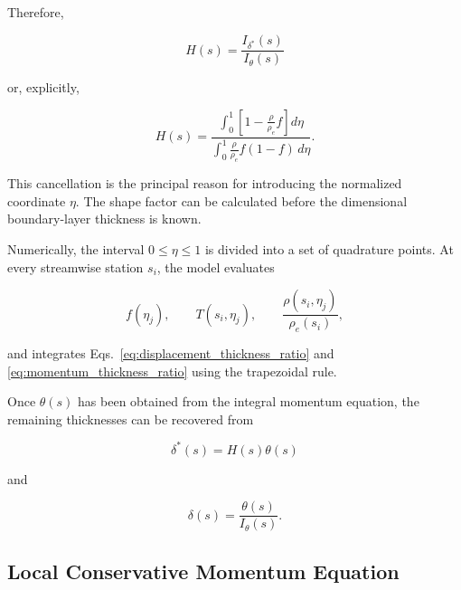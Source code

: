 Therefore,

\begin{equation}
    \boxed{
    H(s)
    =
    \frac{I_{\delta^*}(s)}
         {I_\theta(s)}
    }
    \label{eq:shape_factor_ratio}
\end{equation}

or, explicitly,

\begin{equation}
    \boxed{
    H(s)
    =
    \frac{
        \displaystyle
        \int_0^1
        \left[
            1-
            \frac{\rho}{\rho_e}f
        \right]d\eta
    }{
        \displaystyle
        \int_0^1
        \frac{\rho}{\rho_e}
        f(1-f)\,d\eta
    }
    }.
    \label{eq:shape_factor_profile_closure}
\end{equation}

This cancellation is the principal reason for introducing the normalized
coordinate \(\eta\). The shape factor can be calculated before the dimensional
boundary-layer thickness is known.

Numerically, the interval \(0\leq\eta\leq1\) is divided into a set of
quadrature points. At every streamwise station \(s_i\), the model evaluates

\begin{equation}
    f(\eta_j),\qquad
    T(s_i,\eta_j),\qquad
    \frac{\rho(s_i,\eta_j)}{\rho_e(s_i)},
\end{equation}

and integrates Eqs.~\eqref{eq:displacement_thickness_ratio} and
\eqref{eq:momentum_thickness_ratio} using the trapezoidal rule.

Once \(\theta(s)\) has been obtained from the integral momentum equation, the
remaining thicknesses can be recovered from

\begin{equation}
    \boxed{
    \delta^*(s)=H(s)\theta(s)
    }
    \label{eq:delta_star_from_H_theta}
\end{equation}

and

\begin{equation}
    \boxed{
    \delta(s)
    =
    \frac{\theta(s)}
         {I_\theta(s)}
    }.
    \label{eq:physical_delta_from_theta}
\end{equation}

\subsection{Local Conservative Momentum Equation}

